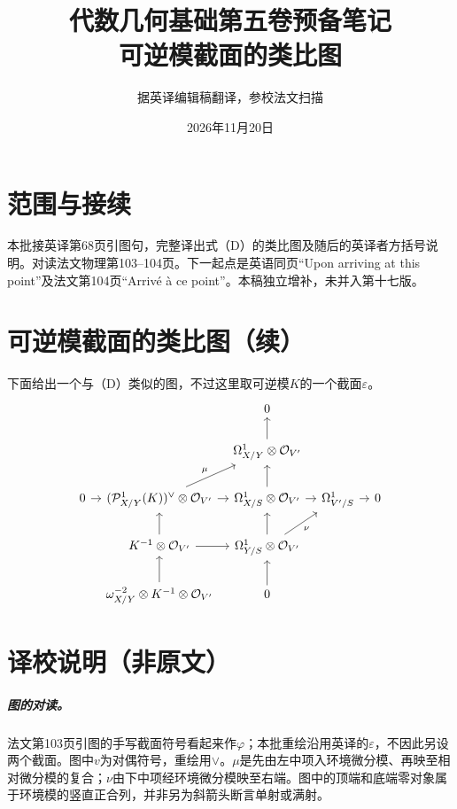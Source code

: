 \documentclass[openany,fontset=fandol]{ctexbook}
\newcommand{\Oa}{\mathcal O}
\begin{document}
\title{代数几何基础第五卷预备笔记\\可逆模截面的类比图}
\author{据英译编辑稿翻译，参校法文扫描}
\date{2026年11月20日}
\maketitle
\chapter*{范围与接续}
本批接英译第68页引图句，完整译出式（D）的类比图及随后的英译者方括号说明。对读法文物理第103--104页。下一起点是英语同页“Upon arriving at this point”及法文第104页“Arrivé à ce point”。本稿独立增补，未并入第十七版。
\chapter*{可逆模截面的类比图（续）}
下面给出一个与（D）类似的图，不过这里取可逆模$K$的一个截面$\varepsilon$。
\[
\begin{tikzcd}[column sep=0.8em,row sep=1.8em]
 & & 0 & & \\
 & & \Omega^1_{X/Y}\otimes\Oa_{V'} \arrow[u] & & \\
0 \arrow[r] &
 (\mathcal P^1_{X/Y}(K))^\vee\otimes\Oa_{V'}
 \arrow[r] \arrow[ur,"\mu"] &
 \Omega^1_{X/S}\otimes\Oa_{V'} \arrow[u] \arrow[r] &
 \Omega^1_{V'/S} \arrow[r] & 0 \\
 & K^{-1}\otimes\Oa_{V'} \arrow[u] \arrow[r] &
 \Omega^1_{Y/S}\otimes\Oa_{V'} \arrow[u] \arrow[ur,"\nu"'] & & \\
 & \omega_{X/Y}^{-2}\otimes K^{-1}\otimes\Oa_{V'} \arrow[u] &
 0 \arrow[u] & &
\end{tikzcd}
\]

\chapter*{译校说明（非原文）}
\paragraph{图的对读。}
法文第103页引图的手写截面符号看起来作$\varphi$；本批重绘沿用英译的$\varepsilon$，不因此另设两个截面。图中$v$为对偶符号，重绘用$\vee$。$\mu$是先由左中项入环境微分模、再映至相对微分模的复合；$\nu$由下中项经环境微分模映至右端。图中的顶端和底端零对象属于环境模的竖直正合列，并非另为斜箭头断言单射或满射。
\end{document}
